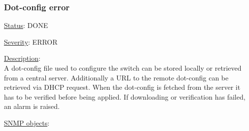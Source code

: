 \subsubsection{\bf Dot-config error}
		\label{fail:other:dot-config}
		\begin{pck_descr}
			\item [] \underline{Status}: DONE
			\item [] \underline{Severity}: ERROR
			\item [] \underline{Description}:\\
				A dot-config file used to configure the switch can be stored locally or
				retrieved from a central server. Additionally a URL to the remote
        dot-config can be retrieved via DHCP request. When the dot-config is
        fetched from the server it has to be verified before being applied. If
        downloading or verification has failed, an alarm is raised.
			\item [] \underline{SNMP objects}:\\
        {\footnotesize
				 \\
				 \\
				 \\
				 \\
				\\
         }
		\end{pck_descr}

